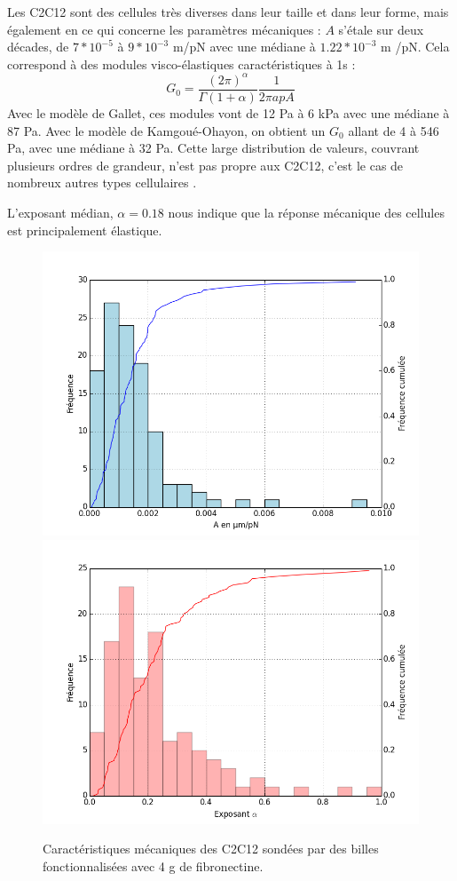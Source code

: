Les C2C12 sont des cellules très diverses dans leur taille et dans leur forme, mais également en ce qui concerne les paramètres mécaniques : $A$ s'étale sur deux décades, de $7*10^{-5}$ à $9* 10^{-3}$ \micro m/pN avec une médiane à $1.22 * 10^{-3}$ \micro m /pN.  Cela correspond à des modules visco-élastiques caractéristiques à 1s : 
$$G_0 = \frac{(2 \pi)^{\alpha}}{\Gamma(1+\alpha)} \frac{1}{2 \pi a p A}$$ 
Avec le modèle de Gallet, ces modules vont de 12 Pa à 6 kPa avec une médiane à 87 Pa. 
Avec le modèle de Kamgoué-Ohayon, on obtient un $G_0$ allant de 4 à 546 Pa, avec une médiane à 32 Pa. Cette large distribution de valeurs, couvrant plusieurs ordres de grandeur, n'est pas propre aux C2C12, c'est le cas de nombreux autres types cellulaires \parencite{balland_dissipative_2005}. 

L'exposant médian, $\alpha=0.18$ nous indique que la réponse mécanique des cellules est principalement élastique.


\begin{figure}
\includegraphics[scale=0.5]{Figures/A0_Toutes.png} 
\includegraphics[scale=0.5]{Figures/E0_Toutes.png} 
\caption{Caractéristiques mécaniques des C2C12 sondées par des billes fonctionnalisées avec 4 \micro g de fibronectine.}
\end{figure}
 
